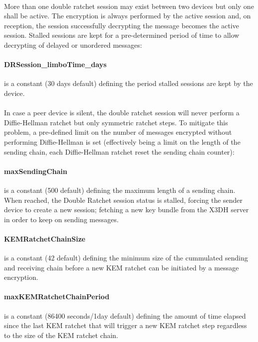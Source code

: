 \documentclass[a4paper,11pt]{article}
\begin{document}
      \paragraph{}More than one double ratchet session may exist between two devices but only one shall be active. The encryption is always performed by the active session and, on reception, the session successfully decrypting the message becomes the active session. Stalled sessions are kept for a pre-determined period of time to allow decrypting of delayed or unordered messages:
      \paragraph{DRSession\_limboTime\_days}is a constant (30 days default) defining the period stalled sessions are kept by the device.
      \paragraph{}In case a peer device is silent, the double ratchet session will never perform a Diffie-Hellman ratchet but only symmetric ratchet steps. To mitigate this problem, a pre-defined limit on the number of messages encrypted without performing Diffie-Hellman is set (effectively being a limit on the length of the sending chain, each Diffie-Hellman ratchet reset the sending chain counter):
      \paragraph{maxSendingChain}is a constant (500 default) defining the maximum length of a sending chain. When reached, the Double Ratchet session status is stalled, forcing the sender device to create a new session; fetching a new key bundle from the X3DH server in order to keep on sending messages.
      \paragraph{KEMRatchetChainSize} is a constant (42 default) defining the minimum size of the cummulated sending and receiving chain before a new KEM ratchet can be initiated by a message encryption.
      \paragraph{maxKEMRatchetChainPeriod} is a constant (86400 seconds/1day default) defining the amount of time elapsed since the last KEM ratchet that will trigger a new KEM ratchet step regardless to the size of the KEM ratchet chain.
\end{document}
